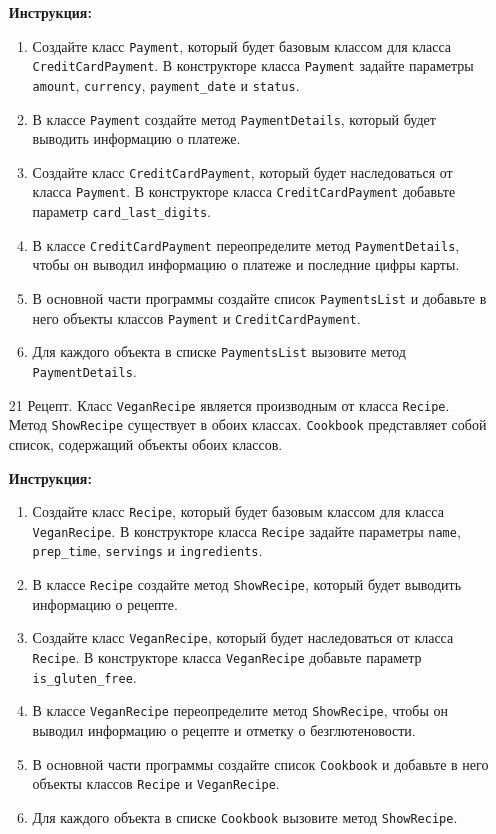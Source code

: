 \begin{enumerate}
\textbf{Инструкция:}
\begin{enumerate}
    \item Создайте класс \texttt{Payment}, который будет базовым классом для класса \texttt{CreditCardPayment}. В конструкторе класса \texttt{Payment} задайте параметры \texttt{amount}, \texttt{currency}, \texttt{payment\_date} и \texttt{status}.
    \item В классе \texttt{Payment} создайте метод \texttt{PaymentDetails}, который будет выводить информацию о платеже.
    \item Создайте класс \texttt{CreditCardPayment}, который будет наследоваться от класса \texttt{Payment}. В конструкторе класса \texttt{CreditCardPayment} добавьте параметр \texttt{card\_last\_digits}.
    \item В классе \texttt{CreditCardPayment} переопределите метод \texttt{PaymentDetails}, чтобы он выводил информацию о платеже и последние цифры карты.
    \item В основной части программы создайте список \texttt{PaymentsList} и добавьте в него объекты классов \texttt{Payment} и \texttt{CreditCardPayment}.
    \item Для каждого объекта в списке \texttt{PaymentsList} вызовите метод \texttt{PaymentDetails}.
\end{enumerate}

\item[21]
Рецепт. Класс \texttt{VeganRecipe} является производным от класса \texttt{Recipe}. Метод \texttt{ShowRecipe} существует в обоих классах. \texttt{Cookbook} представляет собой список, содержащий объекты обоих классов.

\textbf{Инструкция:}
\begin{enumerate}
    \item Создайте класс \texttt{Recipe}, который будет базовым классом для класса \texttt{VeganRecipe}. В конструкторе класса \texttt{Recipe} задайте параметры \texttt{name}, \texttt{prep\_time}, \texttt{servings} и \texttt{ingredients}.
    \item В классе \texttt{Recipe} создайте метод \texttt{ShowRecipe}, который будет выводить информацию о рецепте.
    \item Создайте класс \texttt{VeganRecipe}, который будет наследоваться от класса \texttt{Recipe}. В конструкторе класса \texttt{VeganRecipe} добавьте параметр \texttt{is\_gluten\_free}.
    \item В классе \texttt{VeganRecipe} переопределите метод \texttt{ShowRecipe}, чтобы он выводил информацию о рецепте и отметку о безглютеновости.
    \item В основной части программы создайте список \texttt{Cookbook} и добавьте в него объекты классов \texttt{Recipe} и \texttt{VeganRecipe}.
    \item Для каждого объекта в списке \texttt{Cookbook} вызовите метод \texttt{ShowRecipe}.
\end{enumerate}


\end{enumerate}
